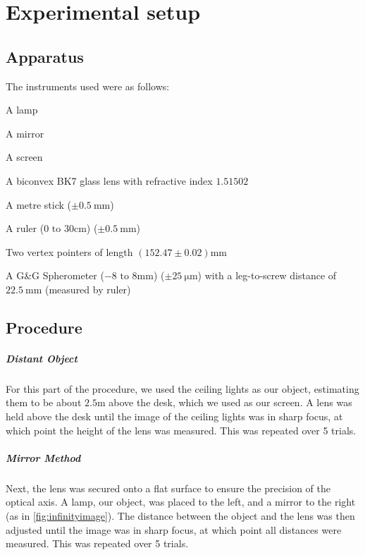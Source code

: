 \chapter{Experimental setup}


\section{Apparatus}
The instruments used were as follows:

\begin{lrapparatus}
    \item A lamp
    \item A mirror
    \item A screen
    \item A biconvex BK7 glass lens with refractive index $1.51502$
    \item A metre stick ($\pm \qty{0.5}{\milli\metre}$)
    \item A ruler ($0 \text{ to } 30\unit{\centi\metre}$) ($\pm \qty{0.5}{\milli\metre}$)
    \item Two vertex pointers of length $(152.47 \pm 0.02) \unit{\milli\metre}$
    \item A G\&G Spherometer ($-8 \text{ to } 8 \unit{\milli\metre}$) ($\pm \qty{25}{\micro\metre}$) with a leg-to-screw distance of $\qty{22.5}{\milli\metre}$ (measured by ruler)
\end{lrapparatus}

\section{Procedure}

\paragraph{Distant Object}
For this part of the procedure, we used the ceiling lights as our object, estimating them to be about $2.5 \unit{\metre}$ above the desk, which we used as our screen. A lens was held above the desk until the image of the ceiling lights was in sharp focus, at which point the height of the lens was measured. This was repeated over 5 trials.

\paragraph{Mirror Method}
Next, the lens was secured onto a flat surface to ensure the precision of the optical axis. A lamp, our object, was placed to the left, and a mirror to the right (as in \cref{fig:infinityimage}). The distance between the object and the lens was then adjusted until the image was in sharp focus, at which point all distances were measured. This was repeated over 5 trials.

